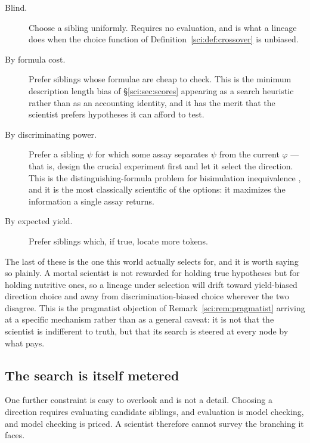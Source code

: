 \begin{description}
\item[Blind.] Choose a sibling uniformly. Requires no evaluation, and is what a lineage does when the
choice function of Definition~\ref{sci:def:crossover} is unbiased.

\item[By formula cost.] Prefer siblings whose formulae are cheap to check. This is the minimum
description length bias of \S\ref{sci:sec:scores} appearing as a search heuristic rather than as an
accounting identity, and it has the merit that the scientist prefers hypotheses it can afford to test.

\item[By discriminating power.] Prefer a sibling $\psi$ for which some assay separates $\psi$ from the
current $\varphi$ --- that is, design the crucial experiment first and let it select the direction.
This is the distinguishing-formula problem for bisimulation inequivalence \cite{Cleaveland}, and it is
the most classically scientific of the options: it maximizes the information a single assay returns.

\item[By expected yield.] Prefer siblings which, if true, locate more tokens.
\end{description}

\begin{remark}
\label{sci:rem:yieldbias}
The last of these is the one this world actually selects for, and it is worth saying so plainly. A
mortal scientist is not rewarded for holding true hypotheses but for holding nutritive ones, so a
lineage under selection will drift toward yield-biased direction choice and away from
discrimination-biased choice wherever the two disagree. This is the pragmatist objection of
Remark~\ref{sci:rem:pragmatist} arriving at a specific mechanism rather than as a general caveat: it is not
that the scientist is indifferent to truth, but that its search is steered at every node by what pays.
\end{remark}

\subsection{The search is itself metered}\label{sci:S6.4}

One further constraint is easy to overlook and is not a detail. Choosing a direction requires
evaluating candidate siblings, and evaluation is model checking, and model checking is priced. A
scientist therefore cannot survey the branching it faces.

